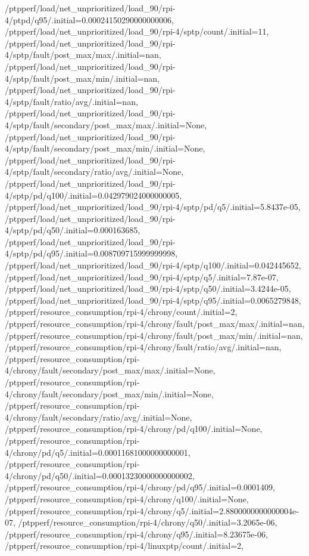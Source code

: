{    /ptpperf/load/net_unprioritized/load_90/rpi-4/ptpd/q95/.initial=0.00024150290000000006,
    /ptpperf/load/net_unprioritized/load_90/rpi-4/sptp/count/.initial=11,
    /ptpperf/load/net_unprioritized/load_90/rpi-4/sptp/fault/post_max/max/.initial=nan,
    /ptpperf/load/net_unprioritized/load_90/rpi-4/sptp/fault/post_max/min/.initial=nan,
    /ptpperf/load/net_unprioritized/load_90/rpi-4/sptp/fault/ratio/avg/.initial=nan,
    /ptpperf/load/net_unprioritized/load_90/rpi-4/sptp/fault/secondary/post_max/max/.initial=None,
    /ptpperf/load/net_unprioritized/load_90/rpi-4/sptp/fault/secondary/post_max/min/.initial=None,
    /ptpperf/load/net_unprioritized/load_90/rpi-4/sptp/fault/secondary/ratio/avg/.initial=None,
    /ptpperf/load/net_unprioritized/load_90/rpi-4/sptp/pd/q100/.initial=0.042979024000000005,
    /ptpperf/load/net_unprioritized/load_90/rpi-4/sptp/pd/q5/.initial=5.8437e-05,
    /ptpperf/load/net_unprioritized/load_90/rpi-4/sptp/pd/q50/.initial=0.000163685,
    /ptpperf/load/net_unprioritized/load_90/rpi-4/sptp/pd/q95/.initial=0.008709715999999998,
    /ptpperf/load/net_unprioritized/load_90/rpi-4/sptp/q100/.initial=0.042445652,
    /ptpperf/load/net_unprioritized/load_90/rpi-4/sptp/q5/.initial=7.87e-07,
    /ptpperf/load/net_unprioritized/load_90/rpi-4/sptp/q50/.initial=3.4244e-05,
    /ptpperf/load/net_unprioritized/load_90/rpi-4/sptp/q95/.initial=0.0065279848,
    /ptpperf/resource_consumption/rpi-4/chrony/count/.initial=2,
    /ptpperf/resource_consumption/rpi-4/chrony/fault/post_max/max/.initial=nan,
    /ptpperf/resource_consumption/rpi-4/chrony/fault/post_max/min/.initial=nan,
    /ptpperf/resource_consumption/rpi-4/chrony/fault/ratio/avg/.initial=nan,
    /ptpperf/resource_consumption/rpi-4/chrony/fault/secondary/post_max/max/.initial=None,
    /ptpperf/resource_consumption/rpi-4/chrony/fault/secondary/post_max/min/.initial=None,
    /ptpperf/resource_consumption/rpi-4/chrony/fault/secondary/ratio/avg/.initial=None,
    /ptpperf/resource_consumption/rpi-4/chrony/pd/q100/.initial=None,
    /ptpperf/resource_consumption/rpi-4/chrony/pd/q5/.initial=0.00011681000000000001,
    /ptpperf/resource_consumption/rpi-4/chrony/pd/q50/.initial=0.00013230000000000002,
    /ptpperf/resource_consumption/rpi-4/chrony/pd/q95/.initial=0.0001409,
    /ptpperf/resource_consumption/rpi-4/chrony/q100/.initial=None,
    /ptpperf/resource_consumption/rpi-4/chrony/q5/.initial=2.8800000000000004e-07,
    /ptpperf/resource_consumption/rpi-4/chrony/q50/.initial=3.2065e-06,
    /ptpperf/resource_consumption/rpi-4/chrony/q95/.initial=8.23675e-06,
    /ptpperf/resource_consumption/rpi-4/linuxptp/count/.initial=2,
}
